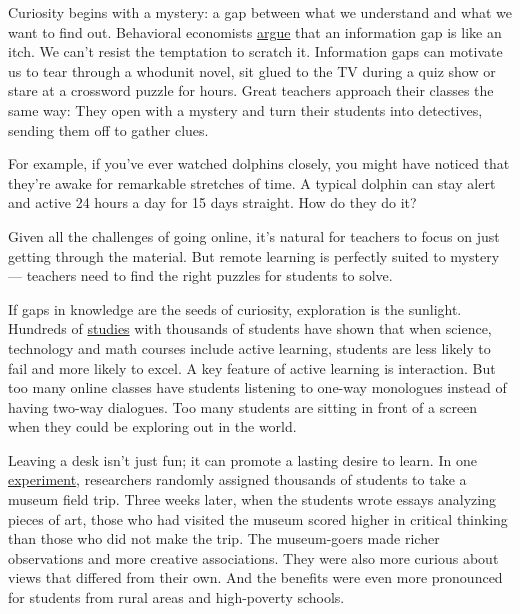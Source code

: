 Curiosity begins with a mystery: a gap between what we understand and
what we want to find out. Behavioral economists
\href{https://books.google.com/books?id=vGmVroMwC0cC\&lpg=PA169\&ots=qwPbpCAlAj\&dq=\%22scientists\%20are\%20relieved\%20of\%20the\%20itch\%20of\%20curiosity\%20that\%20constantly\%22\&pg=PA169\#v=onepage\&q=\%22scientists\%20are\%20relieved\%20of\%20the\%20itch\%20of\%20curiosity\%20that\%20constantly\%22\&f=false}{argue}
that an information gap is like an itch. We can't resist the temptation
to scratch it. Information gaps can motivate us to tear through a
whodunit novel, sit glued to the TV during a quiz show or stare at a
crossword puzzle for hours. Great teachers approach their classes the
same way: They open with a mystery and turn their students into
detectives, sending them off to gather clues.

For example, if you've ever watched dolphins closely, you might have
noticed that they're awake for remarkable stretches of time. A typical
dolphin can stay alert and active 24 hours a day for 15 days straight.
How do they do it?

Given all the challenges of going online, it's natural for teachers to
focus on just getting through the material. But remote learning is
perfectly suited to mystery --- teachers need to find the right puzzles
for students to solve.

If gaps in knowledge are the seeds of curiosity, exploration is the
sunlight. Hundreds of
\href{https://www.pnas.org/content/111/23/8410}{studies} with thousands
of students have shown that when science, technology and math courses
include active learning, students are less likely to fail and more
likely to excel. A key feature of active learning is interaction. But
too many online classes have students listening to one-way monologues
instead of having two-way dialogues. Too many students are sitting in
front of a screen when they could be exploring out in the world.

Leaving a desk isn't just fun; it can promote a lasting desire to learn.
In one
\href{https://www.tandfonline.com/doi/abs/10.1080/19345747.2015.1086915?journalCode=uree20}{experiment},
researchers randomly assigned thousands of students to take a museum
field trip. Three weeks later, when the students wrote essays analyzing
pieces of art, those who had visited the museum scored higher in
critical thinking than those who did not make the trip. The museum-goers
made richer observations and more creative associations. They were also
more curious about views that differed from their own. And the benefits
were even more pronounced for students from rural areas and high-poverty
schools.

